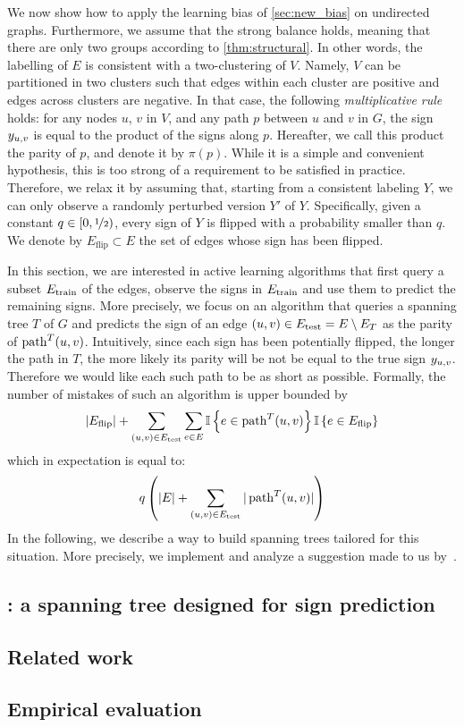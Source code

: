 We now show how to apply the learning bias of \autoref{sec:new_bias} on undirected graphs.
Furthermore, we assume that the strong balance holds, meaning that there are only two groups
according to \autoref{thm:structural}. In other words, the labelling of $E$ is consistent with a
two-clustering of $V$. Namely, $V$ can be partitioned in two clusters such that edges within each
cluster are positive and edges across clusters are negative.
In that case, the following
\emph{multiplicative rule} holds: for any nodes $u$, $v$ in $V$, and any path $p$ between $u$ and
$v$ in $G$, the sign $y_{u, v}$ is equal to the product of the signs along $p$. Hereafter, we call this
product the parity of $p$, and denote it by $\pi(p)$.
While it is a simple and convenient hypothesis, this is too strong
of a requirement to be satisfied in practice. Therefore, we relax it by assuming that, starting from
a consistent labeling $Y$, we can only observe a randomly perturbed version $Y'$ of $Y$.
Specifically, given a constant $q\in [0, \nicefrac{1}{2})$, every sign of $Y$ is flipped with a
probability smaller than $q$. We denote by $E_{\mathrm{flip}} \subset E$ the set of edges whose sign
has been flipped.

In this section, we are interested in active learning algorithms that first query a subset
$E_{\mathrm{train}}$ of the edges, observe the signs in $E_{\mathrm{train}}$ and use them to predict the remaining signs.
More precisely, we focus on an algorithm that queries a spanning tree $T$ of $G$ and predicts the
sign of an edge $(u,v) \in E_{\mathrm{test}} = E \setminus E_T$ as the parity of $\operatorname{path}^T(u, v)$. Intuitively, since
each sign has been potentially flipped, the longer the path in $T$, the more likely its parity will
be not be equal to the true sign $y_{u, v}{}$. Therefore we would like each such path to be as short as
possible.
Formally, the number of mistakes of such an algorithm is upper bounded by~\autocite[Equation
(3)]{Cesa-Bianchi2012b}
\begin{equation*}
  |E_{\mathrm{flip}}| + \sum_{(u,v) \in E_{\mathrm{test}}}
  \sum_{e\in E} \mathbb{I}\left\{{e \in \operatorname{path}^T(u, v)}\right\} \mathbb{I}\left\{{e \in E_{\mathrm{flip}}}\right\}
\end{equation*}
which in expectation is equal to:
\begin{equation}
  \label{eq:stretch_mistakes}
  q\left(|E| + \sum_{(u,v) \in E_{\mathrm{test}}} |\operatorname{path}^T(u, v)| \right)
\end{equation}
In the following, we describe a way to build spanning trees tailored for this situation. More
precisely, we implement and analyze a suggestion made to us by~\textcite{gtxFabio}.

\subsection{\gtx{}: a spanning tree designed for sign prediction}
\label{sub:gtx_algo}



\subsection{Related work}
\label{sub:gtx_related_work}



\subsection{Empirical evaluation}
\label{sub:gtx_empirical_evaluation}


